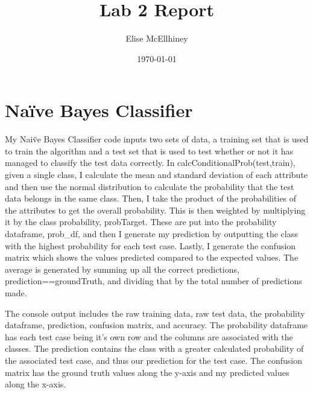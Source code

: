 \documentclass[11pt, oneside]{article}   	%
\title{Lab 2 Report}
\author{Elise McEllhiney}
\date{\today}							%
\begin{document}
\maketitle
\section*{Na\"ive Bayes Classifier}
My Nai\"ve Bayes Classifier code inputs two sets of data, a training set that is used to train the algorithm and a test set that is used to test whether or not it has managed to classify the test data correctly.  In calcConditionalProb(test,train), given a single class, I calculate the mean and standard deviation of each attribute and then use the normal distribution to calculate the probability that the test data belongs in the same class.  Then, I take the product of the probabilities of the attributes to get the overall probability.  This is then weighted by multiplying it by the class probability, probTarget.  These are put into the probability dataframe, prob\_df, and then I generate my prediction by outputting the class with the highest probability for each test case.  Lastly, I generate the confusion matrix which shows the values predicted compared to the expected values.  The average is generated by summing up all the correct predictions, prediction==groundTruth, and dividing that by the total number of predictions made.

The console output includes the raw training data, raw test data, the probability dataframe, prediction, confusion matrix, and accuracy. The probability dataframe has each test case being it's own row and the columns are associated with the classes.  The prediction contains the class with a greater calculated probability of the associated test case, and thus our prediction for the test case.  The confusion matrix has the ground truth values along the y-axis and my predicted values along the x-axis.
\end{document}
